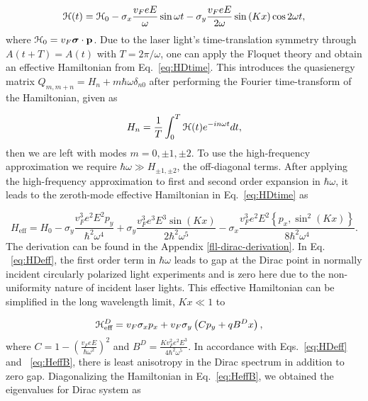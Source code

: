 \begin{equation}\label{eq:HDtime}
  \mathcal{H}(t)=\mathcal{H}_{0} - \sigma _{x} \dfrac{v_F eE}{\omega} \sin {\omega t} - \sigma _{y} \dfrac{v_F eE}{2\omega}\sin{(Kx)} \cos2\omega t,
\end{equation}%
where $\mathcal{H}_0 = v_{F}\bm{\sigma}\cdot\mathbf{p}$.
Due to the laser light's time-translation symmetry through $A(t+T)=A(t)$ with $T=2\pi /\omega $, one can apply the Floquet theory \cite{AEE, MBL, supp} and obtain an effective Hamiltonian from Eq.~\eqref{eq:HDtime}.
This introduces the quasienergy matrix $Q_{m,m+n} = H_n + m\hbar\omega\delta_{n0}$ after performing the Fourier time-transform of the Hamiltonian, given as

\begin{equation} \label{eq:fourier-time-transform}
  H_n = \dfrac{1}{T} \int_{0}^{T} \mathcal{H}(t) e^{-in\omega t} dt,
\end{equation}
then we are left with modes $m=0,\pm1,\pm2$.
To use the high-frequency approximation we require $\hbar\omega \gg H_{\pm1,\pm2}$, the off-diagonal terms.
After applying the high-frequency approximation to first and second order expansion in $\hbar\omega$, it leads to the zeroth-mode effective Hamiltonian in Eq.~\eqref{eq:HDtime} as

\begin{equation} \label{eq:HDeff}
  H_{\text{eff}}= H_{0}-\sigma_y\frac{v_F^3 e^2 E^2 p_y}{\hbar^{2}\omega^{4}}
  +\sigma_y\frac{v_F^3 e^3 E^{3}\sin{(Kx)}}{2\hbar^{2}\omega^{5}}
  -\sigma_x\frac{v_F^3 e^2 E^2 \left\{p_x, \sin^2{(Kx)} \right\} }{8\hbar^{2}\omega^{4}}.
\end{equation}
The derivation can be found in the Appendix \ref{fll-dirac-derivation}.
In Eq. ~\eqref{eq:HDeff}, the first order term in $\hbar \omega$ leads to gap at the Dirac point in normally incident circularly polarized light experiments \cite{YHW, JWM} and is zero here due to the non-uniformity nature of incident laser lights.
This effective Hamiltonian can be simplified in the long wavelength limit, $Kx \ll 1$ to

\begin{align} \label{eq:HeffB}
  \mathcal{H}_{\text{eff}}^D &= v_{F}\sigma_{x}p_{x}+v_F\sigma_{y} \left( C p_{y} + qB^Dx \right),
\end{align}%
where $C = 1-\left(\tfrac{v_{F}eE}{\hbar\omega^2}\right)^2$ and $B^D=\frac{Kv_F^2 e^2E^3}{4\hbar^{2}\omega^{5}}$.
In accordance with Eqs.~\eqref{eq:HDeff} and ~\eqref{eq:HeffB}, there is least anisotropy in the Dirac spectrum in addition to zero gap.
Diagonalizing the Hamiltonian in Eq.~\eqref{eq:HeffB}, we obtained the eigenvalues for Dirac system as%

